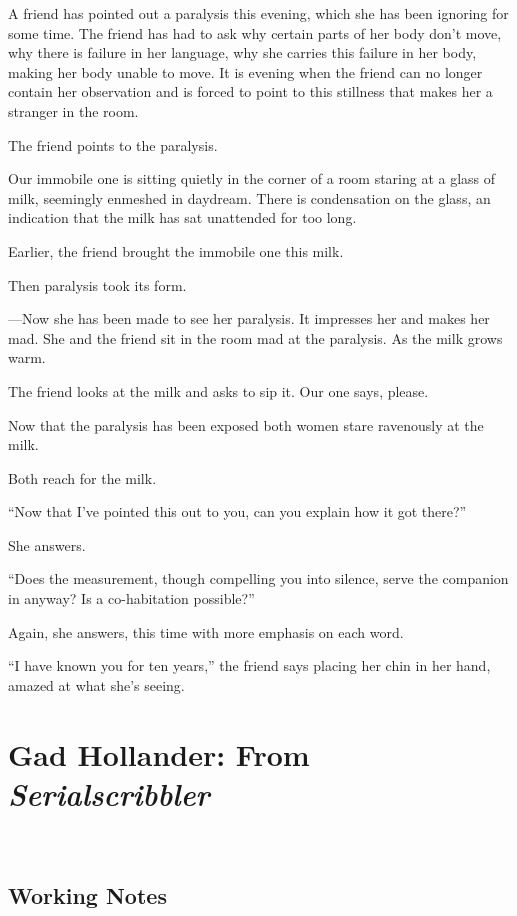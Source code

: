\documentclass[
]{memoir}
\begin{document}
A friend has pointed out a paralysis this evening, which she has been
ignoring for some time. The friend has had to ask why certain parts of
her body don't move, why there is failure in her language, why she
carries this failure in her body, making her body unable to move. It is
evening when the friend can no longer contain her observation and is
forced to point to this stillness that makes her a stranger in the room.

The friend points to the paralysis.

Our immobile one is sitting quietly in the corner of a room staring at a
glass of milk, seemingly enmeshed in daydream. There is condensation on
the glass, an indication that the milk has sat unattended for too long.

Earlier, the friend brought the immobile one this milk.

Then paralysis took its form.

---Now she has been made to see her paralysis. It impresses her and
makes her mad. She and the friend sit in the room mad at the paralysis.
As the milk grows warm.

The friend looks at the milk and asks to sip it. Our one says, please.

Now that the paralysis has been exposed both women stare ravenously at
the milk.

Both reach for the milk.

``Now that I've pointed this out to you, can you explain how it got
there?''

She answers.

``Does the measurement, though compelling you into silence, serve the
companion in anyway? Is a co-habitation possible?''

Again, she answers, this time with more emphasis on each word.

``I have known you for ten years,'' the friend says placing her chin in
her hand, amazed at what she's seeing.

\hypertarget{gad-hollander-from-serialscribbler}{%
\chapter{\texorpdfstring{Gad Hollander: From
\emph{Serialscribbler}}{Gad Hollander: From Serialscribbler}}\label{gad-hollander-from-serialscribbler}}

~

\hypertarget{working-notes-4}{%
\section*{Working Notes}\label{working-notes-4}}
\end{document}
